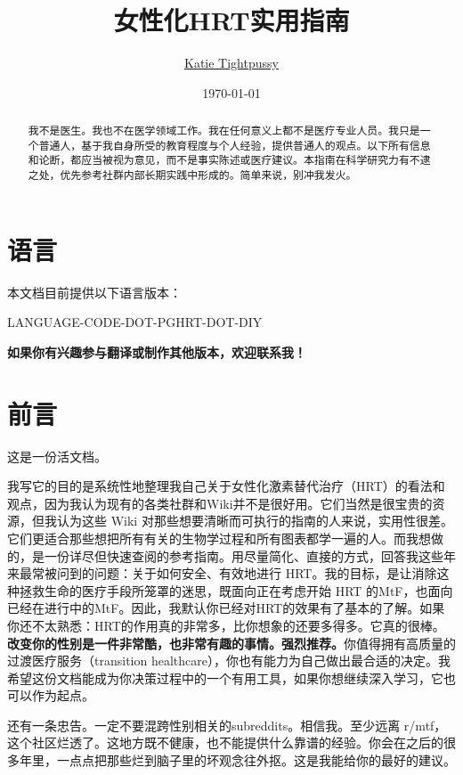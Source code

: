 \documentclass{article}
\title{女性化HRT实用指南}
\author{\href{https://katea.gay/}{Katie Tightpussy}}
\date{\today}
\begin{document}
\maketitle
\tableofcontents
\begin{abstract}
  我不是医生。我也不在医学领域工作。我在任何意义上都不是医疗专业人员。我只是一个普通人，基于我自身所受的教育程度与个人经验，提供普通人的观点。以下所有信息和论断，都应当被视为意见，而不是事实陈述或医疗建议。本指南在科学研究力有不逮之处，优先参考社群内部长期实践中形成的。简单来说，别冲我发火。
\end{abstract}

\section*{语言}

本文档目前提供以下语言版本：

LANGUAGE-CODE-DOT-PGHRT-DOT-DIY

\noindent\textbf{如果你有兴趣参与翻译或制作其他版本，欢迎联系我！}



\section{前言}

这是一份活文档。

我写它的目的是系统性地整理我自己关于女性化激素替代治疗（HRT）的看法和观点，因为我认为现有的各类社群和Wiki并不是很好用。它们当然是很宝贵的资源，但我认为这些 Wiki 对那些想要清晰而可执行的指南的人来说，实用性很差。它们更适合那些想把所有有关的生物学过程和所有图表都学一遍的人。而我想做的，是一份详尽但快速查阅的参考指南。用尽量简化、直接的方式，回答我这些年来最常被问到的问题：关于如何安全、有效地进行 HRT。我的目标，是让消除这种拯救生命的医疗手段所笼罩的迷思，既面向正在考虑开始 HRT 的MtF，也面向已经在进行中的MtF。因此，我默认你已经对HRT的效果有了基本的了解。如果你还不太熟悉：HRT的作用真的非常多，比你想象的还要多得多。它真的很棒。\textbf{改变你的性别是一件非常酷，也非常有趣的事情。强烈推荐。}你值得拥有高质量的过渡医疗服务（transition healthcare），你也有能力为自己做出最合适的决定。我希望这份文档能成为你决策过程中的一个有用工具，如果你想继续深入学习，它也可以作为起点。

还有一条忠告。一定不要混跨性别相关的subreddits。相信我。至少远离 r/mtf，这个社区烂透了。这地方既不健康，也不能提供什么靠谱的经验。你会在之后的很多年里，一点点把那些烂到脑子里的坏观念往外抠。这是我能给你的最好的建议。
\end{document}
